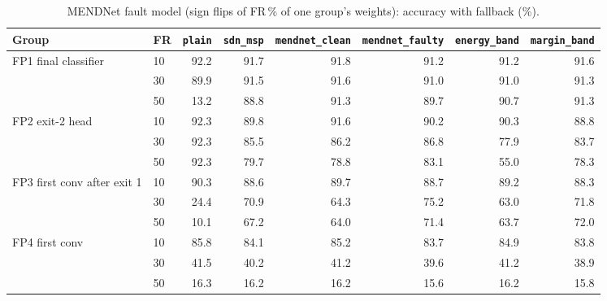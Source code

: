 \documentclass[10pt,a4paper]{article}
\newcommand{\meth}[1]{\texttt{#1}}
\newcommand{\ours}{\meth{margin\_band}}
\begin{document}
\begin{table}[H]
\centering\small
\caption{MENDNet fault model (sign flips of FR\,\% of one group's weights): accuracy with fallback (\%).}
\label{tab:mendacc}
\begin{adjustbox}{max width=\linewidth}
\begin{tabular}{@{}llrrrrrr@{}}
\toprule
Group & FR & \meth{plain} & \meth{sdn\_msp} & \meth{mendnet\_clean} & \meth{mendnet\_faulty} & \meth{energy\_band} & \ours \\
\midrule
FP1 final classifier & 10 & 92.2 & 91.7 & 91.8 & 91.2 & 91.2 & 91.6 \\
                     & 30 & 89.9 & 91.5 & 91.6 & 91.0 & 91.0 & 91.3 \\
                     & 50 & 13.2 & 88.8 & 91.3 & 89.7 & 90.7 & 91.3 \\
FP2 exit-2 head      & 10 & 92.3 & 89.8 & 91.6 & 90.2 & 90.3 & 88.8 \\
                     & 30 & 92.3 & 85.5 & 86.2 & 86.8 & 77.9 & 83.7 \\
                     & 50 & 92.3 & 79.7 & 78.8 & 83.1 & 55.0 & 78.3 \\
FP3 first conv after exit 1 & 10 & 90.3 & 88.6 & 89.7 & 88.7 & 89.2 & 88.3 \\
                     & 30 & 24.4 & 70.9 & 64.3 & 75.2 & 63.0 & 71.8 \\
                     & 50 & 10.1 & 67.2 & 64.0 & 71.4 & 63.7 & 72.0 \\
FP4 first conv       & 10 & 85.8 & 84.1 & 85.2 & 83.7 & 84.9 & 83.8 \\
                     & 30 & 41.5 & 40.2 & 41.2 & 39.6 & 41.2 & 38.9 \\
                     & 50 & 16.3 & 16.2 & 16.2 & 15.6 & 16.2 & 15.8 \\
\bottomrule
\end{tabular}
\end{adjustbox}
\end{table}
\end{document}
